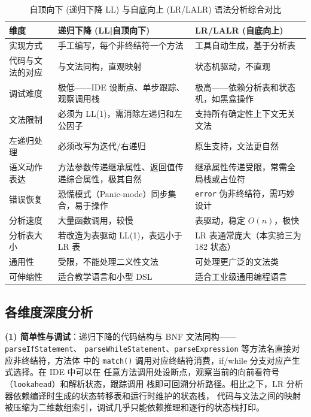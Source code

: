 \documentclass[a4paper]{article}
\begin{document}
\begin{table}[H]
\centering
\caption{自顶向下 (递归下降 LL) 与自底向上 (LR/LALR) 语法分析综合对比}
\label{tab:ll-lr}
\begin{tabular}{@{}p{3cm}p{5.5cm}p{5.5cm}@{}}
\toprule
\textbf{维度} & \textbf{递归下降 (LL|自顶向下)} & \textbf{LR/LALR (自底向上)} \\
\midrule
实现方式 & 手工编写，每个非终结符一个方法 & 工具自动生成，基于分析表 \\
代码与文法的对应 & 与文法同构，直观映射 & 状态机驱动，不直观 \\
调试难度 & 极低——IDE 设断点、单步跟踪、观察调用栈 & 极高——依赖分析表和状态机，如黑盒操作 \\
文法限制 & 必须为 LL(1)，需消除左递归和左公因子 & 支持所有确定性上下文无关文法 \\
左递归处理 & 必须改写为迭代/右递归 & 原生支持，文法更自然 \\
语义动作表达 & 方法参数传递继承属性、返回值传递综合属性，极其自然 & 继承属性传递受限，常需全局栈或占位符 \\
错误恢复 & 恐慌模式（Panic-mode）同步集合，易于操作 & \texttt{error} 伪非终结符，需巧妙设计 \\
分析速度 & 大量函数调用，较慢 & 表驱动，稳定 $O(n)$，极快 \\
分析表大小 & 若改造为表驱动 LL(1)，表远小于 LR 表 & LR 表通常庞大（本实验三为 182 状态） \\
通用性 & 受限，不能处理二义性文法 & 可处理更广泛的文法类 \\
可伸缩性 & 适合教学语言和小型 DSL & 适合工业级通用编程语言 \\
\bottomrule
\end{tabular}
\end{table}

\subsection{各维度深度分析}

\textbf{(1) 简单性与调试}：递归下降的代码结构与 BNF 文法同构——\texttt{parseIfStatement}、
\texttt{parseWhileStatement}、\texttt{parseExpression} 等方法名直接对应非终结符，方法体
中的 \texttt{match()} 调用对应终结符消费，if/while 分支对应产生式选择。在 IDE 中可以在
任意方法调用处设断点，观察当前的向前看符号（\texttt{lookahead}）和解析状态，跟踪调用
栈即可回溯分析路径。相比之下，LR 分析器依赖编译时生成的状态转移表和运行时维护的状态栈，
代码与文法之间的映射被压缩为二维数组索引，调试几乎只能依赖推理和逐行的状态栈打印。
\end{document}
